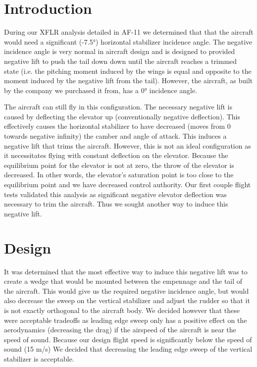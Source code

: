 \documentclass[]{auvsi_doc}
\begin{document}
\begin{AUVSITitlePage}
\begin{artifacttable} 
\end{artifacttable}

\end{AUVSITitlePage}
\section{Introduction}

During our XFLR analysis detailed in AF-11 we determined that that the aircraft would need a significant (-7.5°) horizontal stabilizer incidence angle. The negative incidence angle is very normal in aircraft design and is designed to provided negative lift to push the tail down down until the aircraft reaches a trimmed state (i.e. the pitching moment induced by the wings is equal and opposite to the moment induced by the negative lift from the tail). However, the aircraft, as built by the company we purchased it from, has a 0° incidence angle. 

The aircraft can still fly in this configuration. The necessary negative lift is caused by deflecting the elevator up (conventionally negative deflection). This effectively causes the horizontal stabilizer to have decreased (moves from 0 towards negative infinity) the camber and angle of attack. This induces a negative lift that trims the aircraft.  However, this is not an ideal configuration as it necessitates flying with constant deflection on the elevator. Because the equilibrium point for the elevator is not at zero, the throw of the elevator is decreased. In other words, the elevator's saturation point is too close to the equilibrium point and we have decreased control authority. Our first couple flight tests validated this analysis as significant negative elevator deflection was necessary to trim the aircraft. Thus we sought another way to induce this negative lift. 

\section{Design}

It was determined that the most effective way to induce this negative lift was to create a wedge that would be mounted between the empennage and the tail of the aircraft. This would give us the required negative incidence angle, but would also decrease the sweep on the vertical stabilizer and adjust the rudder so that it is not exactly orthogonal to the aircraft body. We decided however that these were acceptable tradeoffs as leading edge sweep only has a positive effect on the aerodynamics (decreasing the drag) if the airspeed of the aircraft is near the speed of sound. Because our design flight speed is significantly below the speed of sound (15 m/s) We decided that decreasing the leading edge sweep of the vertical stabilizer is acceptable.
 
\end{document}
